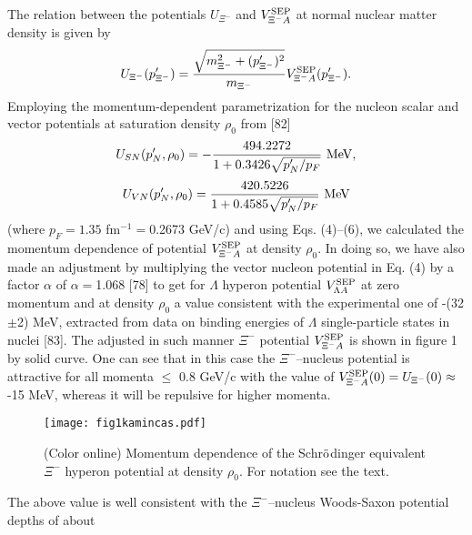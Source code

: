 \documentclass[12pt]{article}
\begin{document}
The relation between the potentials $U_{\Xi^-}$ and $V_{{\Xi^-}A}^{\rm SEP}$ at normal nuclear
matter density is given by
\begin{equation}
U_{\Xi^-}({p^{\prime}_{\Xi^-}})=
\frac{\sqrt{m^2_{\Xi^-}+({p^{\prime}_{\Xi^-}})^2}}{m_{\Xi^-}}V_{{\Xi^-}A}^{\rm SEP}({p^{\prime}_{\Xi^-}}).
\end{equation}
Employing the momentum-dependent parametrization for the nucleon scalar and vector potentials
at saturation density $\rho_0$ from [82]
\begin{equation}
U_{SN}(p^{\prime}_{N},\rho_0)=-\frac{494.2272}{1+0.3426\sqrt{p^{\prime}_{N}/p_F}}~{\rm MeV},
\end{equation}
\begin{equation}
U_{VN}(p^{\prime}_{N},\rho_0)=\frac{420.5226}{1+0.4585\sqrt{p^{\prime}_{N}/p_F}}~{\rm MeV}
\end{equation}
(where $p_F=1.35$ fm$^{-1}=$0.2673 GeV/c)
and using Eqs. (4)--(6), we calculated the momentum dependence of potential
$V_{{\Xi^-}A}^{\rm SEP}$ at density $\rho_0$.
In doing so,
we have also made an adjustment by multiplying the vector nucleon potential in Eq. (4) by a factor $\alpha$
of $\alpha=$1.068 [78] to get for $\Lambda$ hyperon potential $V_{{\Lambda}A}^{\rm SEP}$ at zero momentum
and at density $\rho_0$ a value consistent with the
experimental one of -(32$\pm$2) MeV, extracted from data on binding energies
of $\Lambda$ single-particle states in nuclei [83]. The adjusted in such manner $\Xi^-$ potential
$V_{{\Xi^-}A}^{\rm SEP}$ is shown in figure 1 by solid curve.
One can see that in this case the $\Xi^-$--nucleus potential
is attractive for all momenta $\le$ 0.8 GeV/c with the value of
$V_{{\Xi^-}A}^{\rm SEP}(0)=U_{\Xi^-}(0)\approx$-15 MeV,
whereas it will be repulsive for higher momenta.
\begin{figure}[!ht]
\begin{center}
\texttt{[image: fig1kamincas.pdf]}
\vspace*{-2mm} \caption{(Color online) Momentum dependence of the Schr$\ddot{\rm o}$dinger equivalent
${\Xi^-}$ hyperon potential at density $\rho_0$. For notation see the text.}
\label{void}
\end{center}
\end{figure}
The above value is well consistent with the $\Xi^-$--nucleus Woods-Saxon potential depths of about
\end{document}
